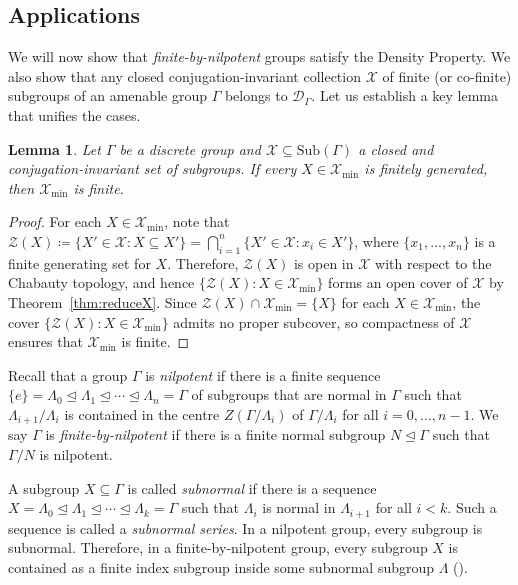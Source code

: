 \documentclass[11pt, oneside, reqno]{amsart}
\newcommand{\PRLsep}{\noindent\makebox[\linewidth]{\resizebox{0.3333\linewidth}{1pt}{$\bullet$}}\bigskip}
\newtheorem{lem}[thm]{Lemma}
\theoremstyle{definition}
\theoremstyle{remark}
\numberwithin{equation}{section}
\begin{document}
\PRLsep

\subsection{Applications}\label{subsec:applications}

We will now show that \emph{finite-by-nilpotent} groups satisfy the Density Property. We also show that any closed conjugation-invariant collection $\mathcal{X}$ of finite (or co-finite) subgroups of an amenable group $\Gamma$ belongs to $\mathcal{D}_\Gamma$. Let us establish a key lemma that unifies the cases.

\begin{lem}
\label{lem:finitemin}
    Let $\Gamma$ be a discrete group and $\mathcal{X} \subseteq \mathrm{Sub}(\Gamma)$ a closed and conjugation-invariant set of subgroups. If every $X\in \mathcal{X}_\mathrm{min}$ is finitely generated, then $\mathcal{X}_{\mathrm{min}}$ is finite.
\end{lem}
\begin{proof}
    For each $X\in \mathcal{X}_\text{min}$, note that $\mathcal{Z}(X) \coloneq \{X'\in\mathcal{X} \colon X\subseteq X'\} = \bigcap^{n}_{i=1}\{X'\in \mathcal{X} \colon x_{i}\in X'\}$, where $\{x_{1},...,x_{n}\}$ is a finite generating set for $X$. Therefore, $\mathcal{Z}(X)$ is open in $\mathcal{X}$ with respect to the Chabauty topology, and hence $\{\mathcal{Z}(X) \colon X \in \mathcal{X}_{\text{min}}\}$ forms an open cover of $\mathcal{X}$ by Theorem~\ref{thm:reduceX}. Since $\mathcal{Z}(X)\cap \mathcal{X}_{\text{min}} = \{X\}$ for each $X\in\mathcal{X}_{\text{min}}$, the cover $\{\mathcal{Z}(X) \colon X \in \mathcal{X}_{\text{min}}\}$ admits no proper subcover, so compactness of $\mathcal{X}$ ensures that $\mathcal{X}_{\text{min}}$ is finite.
\end{proof}

Recall that a group $\Gamma$ is \emph{nilpotent} if there is a finite sequence $\{e\} = \Lambda_{0} \trianglelefteq \Lambda_{1} \trianglelefteq \cdots \trianglelefteq \Lambda_{n} = \Gamma$ of subgroups that are normal in $\Gamma$ such that $\Lambda_{i+1}/\Lambda_{i}$ is contained in the centre $Z(\Gamma/\Lambda_{i})$ of $\Gamma/\Lambda_{i}$ for all $i = 0, \dots, n-1$. We say $\Gamma$ is \emph{finite-by-nilpotent} if there is a finite normal subgroup $N\trianglelefteq\Gamma$ such that $\Gamma/N$ is nilpotent.

A subgroup $X\subseteq \Gamma$ is called \emph{subnormal} if there is a sequence $X = \Lambda_{0}\trianglelefteq \Lambda_{1}\trianglelefteq\cdots\trianglelefteq\Lambda_{k} = \Gamma$ such that $\Lambda_i$ is normal in $\Lambda_{i+1}$ for all $i < k$. Such a sequence is called a \emph{subnormal series}. In a nilpotent group, every subgroup is subnormal. Therefore, in a finite-by-nilpotent group, every subgroup $X$ is contained as a finite index subgroup inside some subnormal subgroup $\Lambda$ (\cite[Section~6.3]{LS87}).
\end{document}
